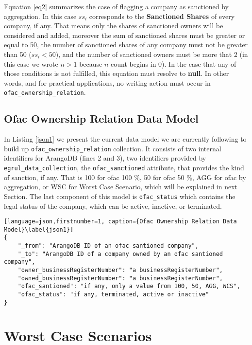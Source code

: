\begin{spacing}{1.5}
 Equation \ref{eq2} summarizes the case of flagging a company as sanctioned by aggregation. In this case $ss_{i}$ corresponds to the \textbf{Sanctioned Shares} of every company, if any. That means only the shares of sanctioned owners will be considered and added, moreover the sum of sanctioned shares must be greater or equal to 50, the number of sanctioned shares of any company must not be greater than 50 ($ ss_{i} < 50 $), and the number of sanctioned owners must be more that 2 (in this case we wrote $n > 1$ because $n$ count begins in 0).  In the case that any of those conditions is not fulfilled, this equation must resolve to \textbf{null}. In other words, and for practical applications, no writing action must occur in \texttt{ofac\_ownership\_relation}. 

\subsection{Ofac Ownership Relation Data Model}

In Listing \ref{json1} we present the current data model we are currently following to build up \texttt{ofac\_ownership\_relation} collection. It consists of two internal identifiers for ArangoDB (lines 2 and 3), two identifiers provided by \texttt{egrul\_data\_collection}, the \texttt{ofac\_sanctioned} attribute, that provides the kind of sanction, if any. That is 100 for ofac 100 \%, 50 for ofac 50 \%, AGG for ofac by aggregation, or WSC for Worst Case Scenario, which will be explained in next Section.
The last component of this model is \texttt{ofac\_status} which contains the legal status of the company, which can be active, inactive, or terminated. 

\begin{lstlisting}[language=json,firstnumber=1, caption={Ofac Ownership Relation Data Model}\label{json1}]
{
	"_from": "ArangoDB ID of an ofac santioned company",
	"_to": "ArangoDB ID of a company owned by an ofac santioned company",
	"owner_businessRegisterNumber": "a businessRegisterNumber", 
	"owned_businessRegisterNumber": "a businessRegisterNumber",
	"ofac_santioned": "if any, only a value from 100, 50, AGG, WCS", 
	"ofac_status": "if any, terminated, active or inactive"
}
\end{lstlisting}


\section{Worst Case Scenarios}\label{wcs}


\end{spacing}
